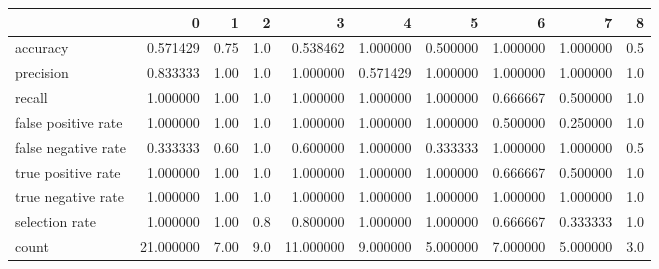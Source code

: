 \begin{tabular}{lrrrrrrrrr}
\toprule
{} &          0 &     1 &    2 &          3 &         4 &         5 &         6 &         7 &    8 \\
\midrule
accuracy            &   0.571429 &  0.75 &  1.0 &   0.538462 &  1.000000 &  0.500000 &  1.000000 &  1.000000 &  0.5 \\
precision           &   0.833333 &  1.00 &  1.0 &   1.000000 &  0.571429 &  1.000000 &  1.000000 &  1.000000 &  1.0 \\
recall              &   1.000000 &  1.00 &  1.0 &   1.000000 &  1.000000 &  1.000000 &  0.666667 &  0.500000 &  1.0 \\
false positive rate &   1.000000 &  1.00 &  1.0 &   1.000000 &  1.000000 &  1.000000 &  0.500000 &  0.250000 &  1.0 \\
false negative rate &   0.333333 &  0.60 &  1.0 &   0.600000 &  1.000000 &  0.333333 &  1.000000 &  1.000000 &  0.5 \\
true positive rate  &   1.000000 &  1.00 &  1.0 &   1.000000 &  1.000000 &  1.000000 &  0.666667 &  0.500000 &  1.0 \\
true negative rate  &   1.000000 &  1.00 &  1.0 &   1.000000 &  1.000000 &  1.000000 &  1.000000 &  1.000000 &  1.0 \\
selection rate      &   1.000000 &  1.00 &  0.8 &   0.800000 &  1.000000 &  1.000000 &  0.666667 &  0.333333 &  1.0 \\
count               &  21.000000 &  7.00 &  9.0 &  11.000000 &  9.000000 &  5.000000 &  7.000000 &  5.000000 &  3.0 \\
\bottomrule
\end{tabular}
